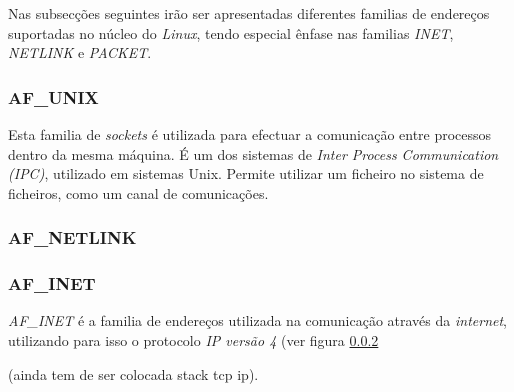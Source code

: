 Nas subsecções seguintes irão ser apresentadas diferentes familias de endereços suportadas no núcleo do \textit{Linux}, tendo especial ênfase nas familias \textit{INET}, \textit{NETLINK} e \textit{PACKET}.





\subsubsection{AF\_UNIX}

Esta familia de \textit{sockets} é utilizada para efectuar a comunicação entre processos dentro da mesma máquina.
É um dos sistemas de \textit{Inter Process Communication (IPC)}, utilizado em sistemas Unix.
Permite utilizar um ficheiro no sistema de ficheiros, como um canal de comunicações.

\subsubsection{AF\_NETLINK}


\subsubsection{AF\_INET}
\label{subsub:af_inet}

\textit{AF\_INET} é a familia de endereços utilizada na comunicação através da \textit{internet}, utilizando para isso o protocolo \textit{IP versão 4} (ver figura \ref{}

 (ainda tem de ser colocada stack tcp ip).

